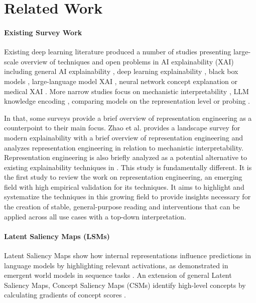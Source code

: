 \section{Related Work}
\paragraph{Existing Survey Work}

Existing deep learning literature produced a number of studies presenting large-scale overview of techniques and open problems in AI explainability (XAI) including general AI explainability \cite{gohel2021explainable}, deep learning explainability \cite{csahin2024unlocking}, black box models  \cite{choudhary2022interpretation}, large-language model XAI \cite{zhao24survey} \cite{danilevsky2020survey} \cite{ehsan2024explainability} \cite{wang2024knowledge}, neural network concept explanation \cite{lee2023neural} \cite{rauker2023toward} or medical XAI \cite{sheu2022survey}. More narrow studies focus on mechanistic interpretability \cite{bereska24} \cite{ferrando24} \cite{kastner24}, LLM knowledge encoding \cite{wang2024knowledge}, comparing models on the representation level \cite{klabunde2023similarity} or probing \cite{belinkov2022probing}.

In that, some surveys provide a brief overview of representation engineering as a counterpoint to their main focus. Zhao et al. \cite{zhao24exppersp} provides a landscape survey for modern explainability with a brief overview of representation engineering and analyzes representation engineering in relation to mechanistic interpretability. Representation engineering is also briefly analyzed as a potential alternative to existing explainability techniques in \cite{zhao24survey}. This study is fundamentally different. It is the first study to review the work on representation engineering, an emerging field with high empirical validation for its techniques. It aims to highlight and systematize the techniques in this growing field to provide insights necessary for the creation of stable, general-purpose reading and interventions that can be applied across all use cases with a top-down interpretation. 

\paragraph{Latent Saliency Maps (LSMs)}  

Latent Saliency Maps show how internal representations influence predictions in language models by highlighting relevant activations, as demonstrated in emergent world models in sequence tasks \cite{li2022emergent}. An extension of general Latent Saliency Maps, Concept Saliency Maps (CSMs) identify high-level concepts by calculating gradients of concept scores \cite{brocki2019concept}. 

